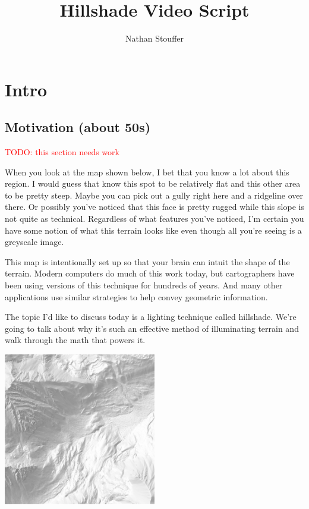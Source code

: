 \documentclass{article}
\newcommand\todo[1]{\textcolor{red}{TODO: #1}}
\newcommand\animation[1]{\textcolor{blue}{ANIMATION: #1}}
\begin{document}
	
\title{Hillshade Video Script}
\author{Nathan Stouffer}
\date{}
\maketitle

\section{Intro}

\subsection{Motivation (about 50s)}

\todo{this section needs work}

When you look at the map shown below, I bet that you know a lot about this region.
I would guess that know this spot to be relatively flat and this other area to be pretty steep.
Maybe you can pick out a gully right here and a ridgeline over there.
Or possibly you've noticed that this face is pretty rugged while this slope is not quite as technical.
Regardless of what features you've noticed, I'm certain you have some notion of what this terrain looks like even though all you're seeing is a greyscale image.


This map is intentionally set up so that your brain can intuit the shape of the terrain.
Modern computers do much of this work today, but cartographers have been using versions of this technique for hundreds of years.
And many other applications use similar strategies to help convey geometric information.

The topic I'd like to discuss today is a lighting technique called hillshade.
We're going to talk about why it's such an effective method of illuminating terrain and walk through the math that powers it.

\begin{center}
	\includegraphics[width=0.5\textwidth,frame]{assets/hillshade-example.png}
\end{center}
\end{document}
